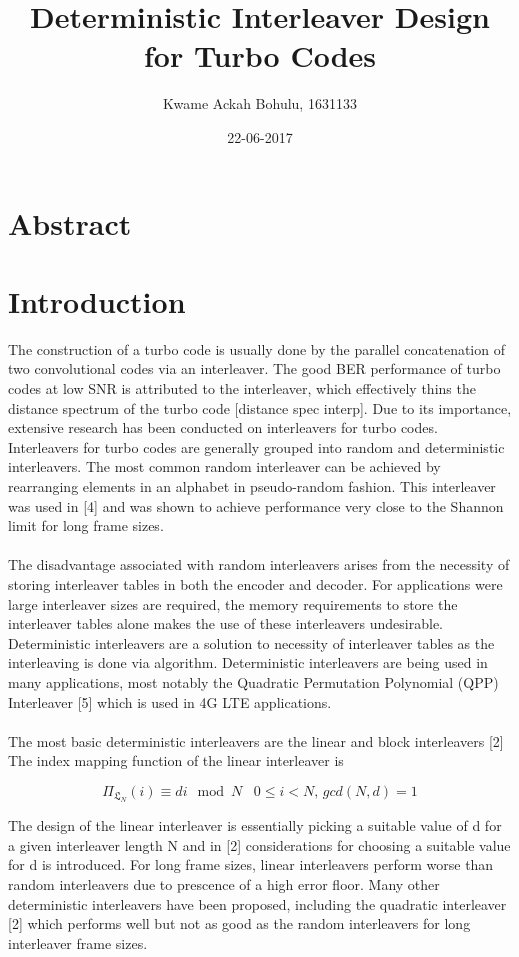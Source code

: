\documentclass[20 pts]{article}
\title{Deterministic Interleaver Design for Turbo Codes}
\author{Kwame Ackah Bohulu, 1631133}
\date{22-06-2017}
\begin{document}
\maketitle
\newpage
\section{Abstract}

\section{Introduction}
The construction of a turbo code is usually done by the parallel concatenation of two
convolutional codes via an interleaver. The good BER performance of turbo codes at
low SNR  is attributed to the interleaver, which effectively thins the distance spectrum
of the turbo code [distance spec interp]. Due to its importance, extensive research has
been conducted on interleavers for turbo codes. Interleavers for turbo codes are 
generally grouped into random and deterministic interleavers. The most common 
random interleaver can be achieved by rearranging elements in an alphabet in
pseudo-random fashion. This interleaver was used in [4] and 
was shown to achieve performance very close to the Shannon limit for long frame 
sizes. 
\paragraph{}
The disadvantage associated with random interleavers arises from the necessity of 
storing interleaver tables in both the encoder and decoder. For applications were 
large interleaver sizes are required, the memory requirements to store the interleaver
tables alone makes the use of these interleavers undesirable.  Deterministic interleavers
are a solution to necessity of interleaver tables as the interleaving is done via 
algorithm. Deterministic interleavers are being used in many applications, most 
notably the Quadratic Permutation Polynomial (QPP) Interleaver [5] which is used 
in 4G LTE applications.
\paragraph{}
The most basic deterministic interleavers are the linear and block interleavers [2]
The index mapping function of the linear interleaver is 

$$ \Pi_{\mathfrak{L}_N}(i) \equiv di \mod N \,\,\,\,\, 0 \leq i < N, \, gcd(N,d)=1$$


The design of the linear interleaver is essentially picking a suitable value of d for a
given interleaver length N and in [2] considerations for choosing a suitable 
value for d is introduced. For long frame sizes, linear interleavers perform worse
than random interleavers due to prescence of a high error floor. Many other 
deterministic interleavers have been proposed, including the quadratic interleaver
[2] which performs well but not as good as the random interleavers for long
interleaver frame sizes. 
\end{document}
